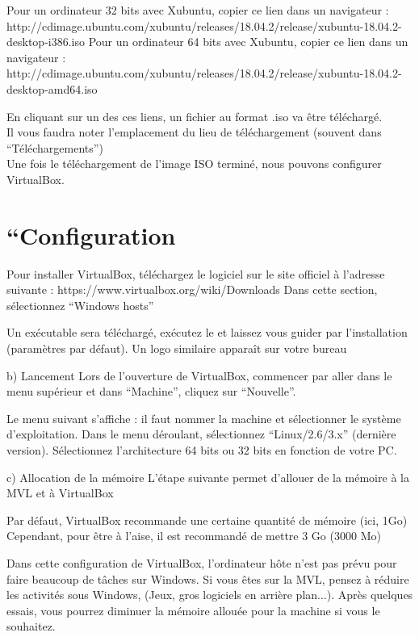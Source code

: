 {Pour un ordinateur 32 bits avec Xubuntu, copier ce lien dans un navigateur : http://cdimage.ubuntu.com/xubuntu/releases/18.04.2/release/xubuntu-18.04.2-desktop-i386.iso
Pour un ordinateur 64 bits avec Xubuntu, copier ce lien dans un navigateur : http://cdimage.ubuntu.com/xubuntu/releases/18.04.2/release/xubuntu-18.04.2-desktop-amd64.iso

En cliquant sur un des ces liens, un fichier au format .iso va être téléchargé.\\
Il vous faudra noter l’emplacement du lieu de téléchargement (souvent dans “Téléchargements”)\\
Une fois le téléchargement de l’image ISO terminé, nous pouvons configurer VirtualBox.


\section{“Configuration}

Pour installer VirtualBox, téléchargez le logiciel sur le site officiel à l’adresse suivante :
https://www.virtualbox.org/wiki/Downloads 
Dans cette section, sélectionnez “Windows hosts”

Un exécutable sera téléchargé, exécutez le et laissez vous guider par l’installation (paramètres par défaut). Un logo similaire apparaît sur votre bureau




    b) Lancement
Lors de l’ouverture de VirtualBox, commencer par aller dans le menu supérieur et dans “Machine”, cliquez sur “Nouvelle”.



Le menu suivant s’affiche : il faut nommer la machine et sélectionner le système d’exploitation.
Dans le menu déroulant, sélectionnez “Linux/2.6/3.x” (dernière version).
Sélectionnez l’architecture 64 bits ou 32 bits en fonction de votre PC.


    c) Allocation de la mémoire
L’étape suivante permet d’allouer de la mémoire à la MVL et à VirtualBox



Par défaut, VirtualBox recommande une certaine quantité de mémoire (ici, 1Go)
Cependant, pour être à l’aise, il est recommandé de mettre 3 Go (3000 Mo)



Dans cette configuration de VirtualBox, l’ordinateur hôte n’est pas prévu pour faire beaucoup de tâches sur Windows. Si vous êtes sur la MVL, pensez à réduire les activités sous Windows, (Jeux, gros logiciels en arrière plan...).
Après quelques essais, vous pourrez diminuer la mémoire allouée pour la machine si vous le souhaitez.














}
